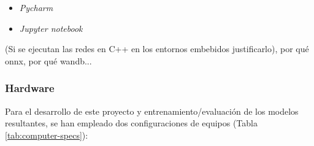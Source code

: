 \begin{itemize}
\begin{itemize}
		\item \textit{Pycharm}
		\item \textit{Jupyter notebook}
	\end{itemize}
\end{itemize}




(Si se ejecutan las redes en C++ en los entornos embebidos justificarlo), por qué onnx, por qué wandb... 


\subsubsection{Hardware}
Para el desarrollo de este proyecto y entrenamiento/evaluación de los modelos resultantes, se han empleado dos configuraciones de equipos (Tabla \ref{tab:computer-specs}):

